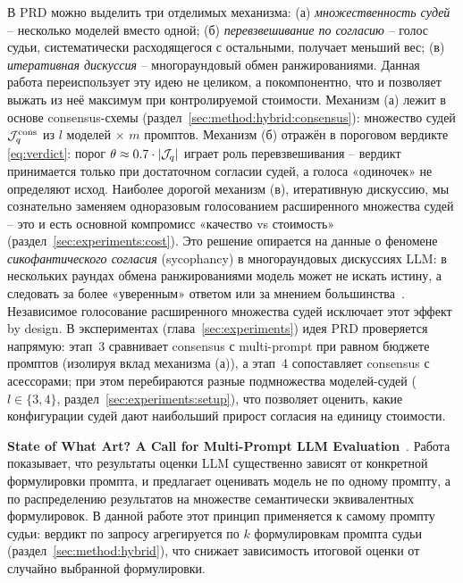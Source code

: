 В PRD можно выделить три отделимых механизма: (а) \emph{множественность
судей} -- несколько моделей вместо одной; (б) \emph{перевзвешивание по
согласию} -- голос судьи, систематически расходящегося с остальными,
получает меньший вес; (в) \emph{итеративная дискуссия} -- многораундовый
обмен ранжированиями.
Данная работа переиспользует эту идею не целиком, а покомпонентно, что и
позволяет выжать из неё максимум при контролируемой стоимости.
Механизм (а) лежит в основе consensus-схемы
(раздел~\ref{sec:method:hybrid:consensus}): множество судей
$\mathcal{J}_q^{\mathrm{cons}}$ из $l$ моделей $\times$ $m$ промптов.
Механизм (б) отражён в пороговом вердикте \eqref{eq:verdict}: порог
$\theta \approx 0.7\cdot\left\lvert\mathcal{J}_q\right\rvert$ играет роль перевзвешивания --
вердикт принимается только при достаточном согласии судей, а голоса
«одиночек» не определяют исход.
Наиболее дорогой механизм (в), итеративную дискуссию, мы сознательно
заменяем одноразовым голосованием расширенного множества судей --
это и есть основной компромисс «качество vs стоимость»
(раздел~\ref{sec:experiments:cost}).
Это решение опирается на данные о феномене \emph{сикофантического согласия} (sycophancy) в многораундовых дискуссиях LLM: в нескольких раундах обмена ранжированиями модель может не искать истину, а следовать за более «уверенным» ответом или за мнением большинства~\cite{sharma2023towards}. Независимое голосование расширенного множества судей исключает этот эффект by design.
В экспериментах (глава~\ref{sec:experiments}) идея PRD проверяется
напрямую: этап~3 сравнивает consensus с multi-prompt при равном бюджете
промптов (изолируя вклад механизма (а)), а этап~4 сопоставляет
consensus с асессорами; при этом перебираются разные подмножества
моделей-судей ($l \in \{3, 4\}$,
раздел~\ref{sec:experiments:setup}), что позволяет оценить, какие
конфигурации судей дают наибольший прирост согласия на единицу
стоимости.

\textbf{State of What Art? A Call for Multi-Prompt LLM
Evaluation}~\cite{mizrahi2024stateofwhatart}.
Работа показывает, что результаты оценки LLM существенно зависят от
конкретной формулировки промпта, и предлагает оценивать модель не по
одному промпту, а по распределению результатов на множестве
семантически эквивалентных формулировок.
В данной работе этот принцип применяется к самому промпту судьи:
вердикт по запросу агрегируется по $k$ формулировкам промпта судьи
(раздел~\ref{sec:method:hybrid}), что снижает зависимость итоговой
оценки от случайно выбранной формулировки.

